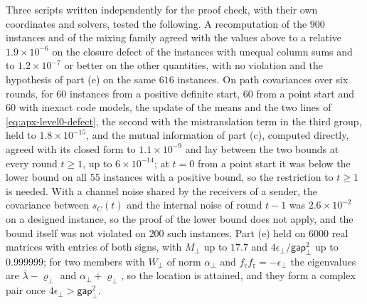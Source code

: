 \begin{numcheck}
Three scripts written independently for the proof check, with their own coordinates and solvers, tested the following. A recomputation of the $900$ instances and of the mixing family agreed with the values above to a relative $1.9\times10^{-6}$ on the closure defect of the instances with unequal column sums and to $1.2\times10^{-7}$ or better on the other quantities, with no violation and the hypothesis of part (e) on the same $616$ instances. On path covariances over six rounds, for $60$ instances from a positive definite start, $60$ from a point start and $60$ with inexact code models, the update of the means and the two lines of \eqref{eq:apx-level0-defect}, the second with the mistranslation term in the third group, held to $1.8\times10^{-15}$, and the mutual information of part (c), computed directly, agreed with its closed form to $1.1\times10^{-9}$ and lay between the two bounds at every round $t\ge1$, up to $6\times10^{-14}$; at $t=0$ from a point start it was below the lower bound on all $55$ instances with a positive bound, so the restriction to $t\ge1$ is needed. With a channel noise shared by the receivers of a sender, the covariance between $s_C(t)$ and the internal noise of round $t-1$ was $2.6\times10^{-2}$ on a designed instance, so the proof of the lower bound does not apply, and the bound itself was not violated on $200$ such instances. Part (e) held on $6000$ real matrices with entries of both signs, with $M_\perp$ up to $17.7$ and $4\epsilon_\perp/\mathsf{gap}_\perp^2$ up to $0.999999$; for two members with $W_\perp$ of norm $\alpha_\perp$ and $f_{\mathrm c}f_{\mathrm r}=-\epsilon_\perp$ the eigenvalues are $\bar\lambda-\varrho_\perp$ and $\alpha_\perp+\varrho_\perp$, so the location is attained, and they form a complex pair once $4\epsilon_\perp>\mathsf{gap}_\perp^2$.
\end{numcheck}

